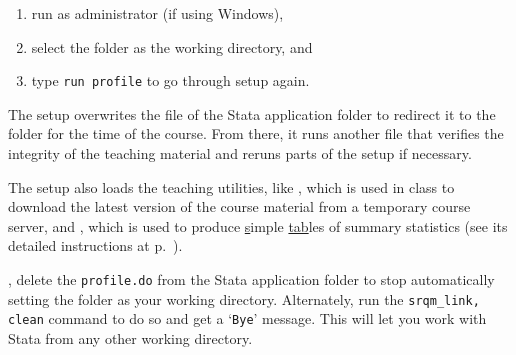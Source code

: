		\begin{enumerate}
			\item run as administrator (if using Windows),
			\item select the \SRQM folder as the working directory, and
			\item type \texttt{run profile} to go through setup again.
		\end{enumerate}
	  
	The setup overwrites the  file of the Stata application folder to redirect it to the \SRQM folder for the time of the course. From there, it runs another  file that verifies the integrity of the teaching material and reruns parts of the setup if necessary.%
		
	The setup also loads the  teaching utilities, like , which is used in class to download the latest version of the course material from a temporary course server, and , which is used to produce \underline{s}imple \underline{tab}les of summary statistics (see its detailed instructions at p.~\pageref{cmd:stab}).%
		
  , delete the \texttt{profile.do} from the Stata application folder to stop automatically setting the \SRQM folder as your working directory. Alternately, run the \texttt{srqm\_link, clean} command to do so and get a `\texttt{Bye}' message. This will let you work with Stata from any other working directory.%
